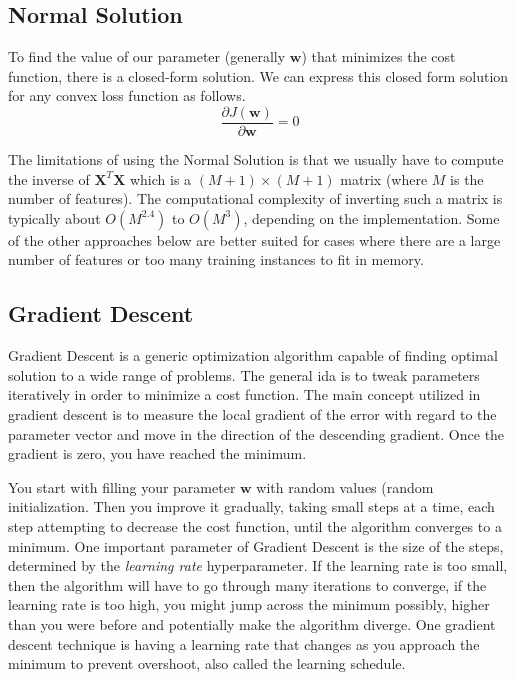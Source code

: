 \documentclass[12pt]{article}
\begin{document}
    \subsection{Normal Solution} \label{sec:NormalSolution}
        To find the value of our parameter (generally $\boldsymbol{w}$) that minimizes the cost function, there is a
        closed-form solution. We can express this closed form solution for any convex loss function as follows.
        $$ \frac{\partial J(\boldsymbol{w})}{\partial \boldsymbol{w}} = 0 $$
        
        The limitations of using the Normal Solution is that we usually have to compute the inverse of
        $\boldsymbol{X}^T\boldsymbol{X}$ which is a $(M+1) \times (M+1)$ matrix (where $M$ is the number of features).
        The computational complexity of inverting such a matrix is typically about $O(M^{2.4})$ to $O(M^{3})$, depending
        on the implementation. Some of the other approaches below are better suited for cases where there are a large
        number of features or too many training instances to fit in memory.

    \subsection{Gradient Descent} \label{sec:GD}
        Gradient Descent is a generic optimization algorithm capable of finding optimal solution to a wide range of
        problems. The general ida is to tweak parameters iteratively in order to minimize a cost function. The main
        concept utilized in gradient descent is to measure the local gradient of the error with regard to the parameter
        vector and move in the direction of the descending gradient. Once the gradient is zero, you have reached the
        minimum.

        You start with filling your parameter $\boldsymbol{w}$ with random values (random initialization. Then you
        improve it gradually, taking small steps at a time, each step attempting to decrease the cost function, until
        the algorithm converges to a minimum. One important parameter of Gradient Descent is the size of the steps,
        determined by the \textit{learning rate} hyperparameter. If the learning rate is too small, then the algorithm
        will have to go through many iterations to converge, if the learning rate is too high, you might jump across the
        minimum possibly, higher than you were before and potentially make the algorithm diverge. One gradient descent
        technique is having a learning rate that changes as you approach the minimum to prevent overshoot, also called
        the learning schedule.
\end{document}
